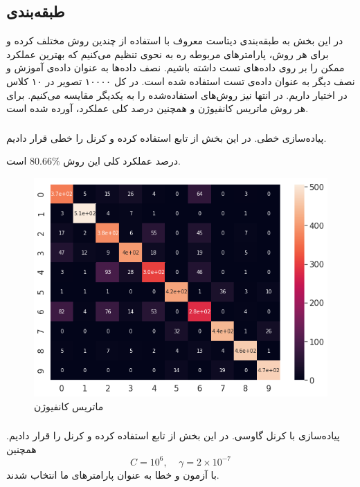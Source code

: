 \documentclass[a4paper]{article}
\begin{document}
\begin{large}

\part{طبقه‌بندی}
در این بخش به طبقه‌بندی دیتاست معروف 
با استفاده از چندین روش مختلف کرده و برای هر روش، پارامتر‌های مربوطه ره به نحوی تنظیم می‌کنیم که بهترین عملکرد ممکن را بر روی داده‌های تست داشته باشیم. نصف داده‌ها به عنوان داده‌ی آموزش و نصف دیگر به عنوان داده‌ی تست استفاده شده است. در کل ۱۰۰۰۰ تصویر در ۱۰ کلاس در اختیار داریم. در انتها نیز روش‌های استفاده‌شده را به یکدیگر مقایسه می‌کنیم. برای هر روش ماتریس کانفیوژن و همچنین درصد کلی عملکرد، آورده شده است.

\section{}
پیاده‌سازی 
خطی. در این بخش از تابع
استفاده ‌کرده و کرنل را خطی قرار دادیم.

درصد عملکرد کلی این روش
$80.66\%$
است.

\begin{figure}[h!]
	\centering
	\includegraphics[scale=0.6]{linSVM.png}
	\caption{ماتریس کانفیوژن 
}
\end{figure}

\section{}
پیاده‌سازی 
با کرنل گاوسی. در این بخش از تابع
استفاده ‌کرده و کرنل را  قرار دادیم. همچنین 
$$C = 10^6 ,\;\;\;\;\gamma = 2\times {10}^{-7}$$
با آزمون و خطا به عنوان پارامتر‌های ما انتخاب شدند.


\end{large}
\end{document}
